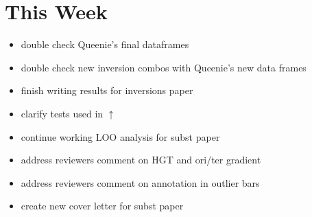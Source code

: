 \documentclass[12pt]{article}
\newcommand{\smel}{\textit{S.\,meliloti}\xspace}
\newcommand{\p}{progressiveMauve\xspace}
\newcommand{\strep}{\textit{Streptomyces}\xspace}
\newcommand{\ecol}{\textit{E.\,coli}\xspace}
\newcommand{\ecoli}{\textit{Escherichia coli}\xspace}
\newcommand{\pa}{pSymA\xspace}
\newcommand{\dn}{\textit{dN}\xspace}
\begin{document}



\section*{This Week}
%
\begin{itemize}
	\item double check Queenie's final dataframes 
	\item double check new inversion combos with Queenie's new data frames
\item finish writing results for inversions paper
\item clarify tests used in $\uparrow$
\item continue working LOO analysis for subst paper
\item address reviewers comment on HGT and ori/ter gradient
\item address reviewers comment on annotation in outlier bars
\item create new cover letter for subst paper


\end{itemize}
\end{document}
